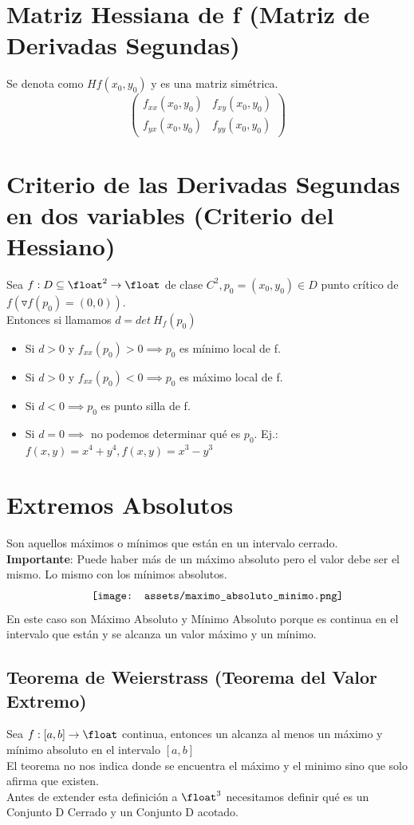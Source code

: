 \documentclass[10pt,a4paper]{article}
\begin{document}
\section*{Matriz Hessiana de f (Matriz de Derivadas Segundas)}
Se denota como $Hf(x_{0}, y_{0})$ y es una matriz simétrica.
\[
\begin{pmatrix}
f_{xx}(x_{0}, y_{0}) & f_{xy}(x_{0}, y_{0}) \\
f_{yx}(x_{0}, y_{0}) & f_{yy}(x_{0}, y_{0})
\end{pmatrix}
\]
\section*{Criterio de las Derivadas Segundas en dos variables (Criterio del Hessiano)}
Sea $f:D \subseteq \float^{2} \rightarrow \float$ de clase $C^{2}, p_{0} = (x_{0}, y_{0}) \in D$ punto crítico de $f(\triangledown f(p_{0}) = (0,0))$. \\
Entonces si llamamos $d = det \ H_{f}(p_{0})$
\begin{itemize}
    \item Si $d>0$ y $f_{xx}(p_{0}) > 0 \implies p_{0}$ es mínimo local de f.
    \item Si $d>0$ y $f_{xx}(p_{0}) < 0 \implies p_{0}$ es máximo local de f.
    \item Si $d<0 \implies p_{0}$ es punto silla de f.
    \item Si $d=0 \implies$ no podemos determinar qué es $p_{0}$. Ej.: $f(x,y) = x^{4} + y^{4}, f(x,y) = x^{3}-y^{3}$
\end{itemize}
\section*{Extremos Absolutos}
Son aquellos máximos o mínimos que están en un intervalo cerrado. \\
\textbf{Importante}: Puede haber más de un máximo absoluto pero el valor debe ser el mismo. Lo mismo con los mínimos absolutos. \\
\[\begin{minipage}[b]{0.6\textwidth}
    \texttt{[image: assets/maximo\_absoluto\_minimo.png]}
\end{minipage}\]
En este caso son Máximo Absoluto y Mínimo Absoluto porque es continua en el intervalo que están y se alcanza un valor máximo y un mínimo. 
\subsection*{Teorema de Weierstrass (Teorema del Valor Extremo)}
Sea $f:[a, b] \rightarrow \float$ continua, entonces un alcanza al menos un máximo y mínimo absoluto en el intervalo $[a, b]$ \\
El teorema no nos indica donde se encuentra el máximo y el minimo sino que solo afirma que existen. \\
Antes de extender esta definición a $\float^{3}$ necesitamos definir qué es un Conjunto D Cerrado y un Conjunto D acotado.
\end{document}
